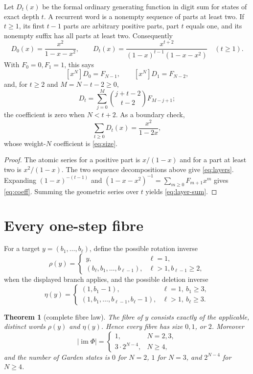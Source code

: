\documentclass[10pt,a4paper]{amsart}
\newtheorem{theorem}{Theorem}[section]
\theoremstyle{definition}
\theoremstyle{remark}
\newcommand{\im}{\operatorname{im}}
\begin{document}
Let $D_t(x)$ be the formal ordinary generating function in digit sum for
states of exact depth $t$.  A recurrent word is a nonempty sequence of parts
at least two.  If $t\ge1$, its first $t-1$ parts are arbitrary positive
parts, part $t$ equals one, and its nonempty suffix has all parts at least two.
Consequently
\begin{equation}
 D_0(x)=\frac{x^2}{1-x-x^2},\qquad
 D_t(x)=\frac{x^{t+2}}{(1-x)^{t-1}(1-x-x^2)}\quad(t\ge1). \label{eq:layers}
\end{equation}
With $F_0=0,F_1=1$, this says
\[
 [x^N]D_0=F_{N-1},\qquad [x^N]D_1=F_{N-2},
\]
and, for $t\ge2$ and $M=N-t-2\ge0$,
\begin{equation}
 [x^N]D_t=\sum_{j=0}^{M}
 \binom{j+t-2}{t-2}F_{M-j+1};                          \label{eq:coeff}
\end{equation}
the coefficient is zero when $N<t+2$.  As a boundary check,
\begin{equation}
 \sum_{t\ge0}D_t(x)=\frac{x^2}{1-2x},                 \label{eq:layer-sum}
\end{equation}
whose weight-$N$ coefficient is \eqref{eq:size}.

\begin{proof}
The atomic series for a positive part is $x/(1-x)$ and for a part at least
two is $x^2/(1-x)$.  The two sequence decompositions above give
\eqref{eq:layers}.  Expanding
$(1-x)^{-(t-1)}$ and
$(1-x-x^2)^{-1}=\sum_{m\ge0}F_{m+1}x^m$ gives
\eqref{eq:coeff}.  Summing the geometric series over $t$ yields
\eqref{eq:layer-sum}.
\end{proof}

\section{Every one-step fibre}

For a target $y=(b_1,\ldots,b_\ell)$, define the possible rotation inverse
\[
 \rho(y)=
 \begin{cases}
 y,&\ell=1,\\
 (b_\ell,b_1,\ldots,b_{\ell-1}),&\ell>1, b_{\ell-1}\ge2,
 \end{cases}
\]
when the displayed branch applies, and the possible deletion inverse
\[
 \eta(y)=
 \begin{cases}
  (1,b_1-1),&\ell=1,\ b_1\ge3,\\
  (1,b_1,\ldots,b_{\ell-1},b_\ell-1),
      &\ell>1,\ b_\ell\ge3.
 \end{cases}
\]

\begin{theorem}[complete fibre law]\label{thm:fibres}
The fibre of $y$ consists exactly of the applicable, distinct words
$\rho(y)$ and $\eta(y)$.  Hence every fibre has size $0,1$, or $2$.  Moreover
\begin{equation}
 |\im\Phi|=
 \begin{cases}
 1,&N=2,3,\\
 3\cdot2^{N-4},&N\ge4,
 \end{cases}                                           \label{eq:image}
\end{equation}
and the number of Garden states is $0$ for $N=2$, $1$ for $N=3$, and
$2^{N-4}$ for $N\ge4$.
\end{theorem}
\end{document}
